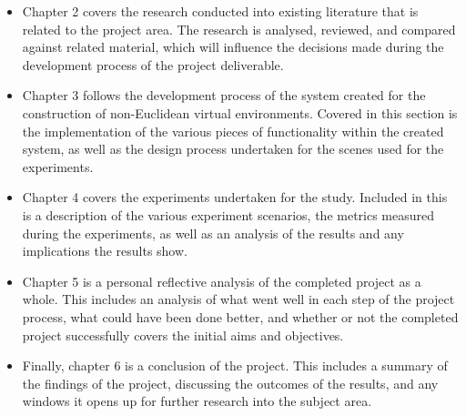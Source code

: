 		\begin{itemize}
			\item Chapter 2 covers the research conducted into existing literature that is related to the project area.
			The research is analysed, reviewed, and compared against related material, which will influence the decisions made during the development process of the project deliverable.

			\item Chapter 3 follows the development process of the system created for the construction of non-Euclidean virtual environments.
			Covered in this section is the implementation of the various pieces of functionality within the created system, as well as the design process undertaken for the scenes used for the experiments.

			\item Chapter 4 covers the experiments undertaken for the study.
			Included in this is a description of the various experiment scenarios, the metrics measured during the experiments, as well as an analysis of the results and any implications the results show.

			\item Chapter 5 is a personal reflective analysis of the completed project as a whole.
			This includes an analysis of what went well in each step of the project process, what could have been done better, and whether or not the completed project successfully covers the initial aims and objectives.

			\item Finally, chapter 6 is a conclusion of the project.
			This includes a summary of the findings of the project, discussing the outcomes of the results, and any windows it opens up for further research into the subject area.
		\end{itemize}
